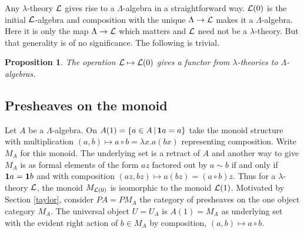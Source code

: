 \documentclass[12pt, amstex, amssymb]{article}
\newtheorem{proposition}[theorem]{Proposition}
\newcommand{\mcat}{\cal}
\newcommand{\app}{{\bf 1}}
\begin{document}
Any $\lambda$-theory $\mcat L$ gives rise to a $\Lambda$-algebra
in a straightforward way. ${\mcat L}(0)$ is the initial $\mcat L$-algebra
and composition with the unique $\Lambda \to {\mcat L}$ makes it a
$\Lambda$-algebra. Here it is only the map $\Lambda \to {\mcat L}$
which matters and ${\mcat L}$ need not be a $\lambda$-theory. But that
generality is of no significance. The following is trivial.
\begin{proposition} 
The operation ${\mcat L} \mapsto {\mcat L}(0)$ gives a functor
from $\lambda$-theories to $\Lambda$-algebras.
\end{proposition}

\subsection{Presheaves on the monoid}\label{monoid}

Let $A$ be a $\Lambda$-algebra. On 
${A}(1) = \{ a\in A \, | \, \app a = a \}$ take the monoid structure
with multiplication
$(a,b) \mapsto a \circ b = \lambda x. a(bx)$
representing composition. Write $M_A$ for this monoid.
The underlying set is a 
retract of $A$ and another way to give $M_A$
is as formal elements of the form $az$ factored out by
$a \sim b$ if and only if $\app a = \app b$ and with
composition $(az, bz) \mapsto a(bz) = (a \circ b)z$.
Thus for a $\lambda$-theory $\cal L$, the monoid 
$M_{{\mcat L}(0)}$ is isomorphic to the monoid ${\mcat L}(1)$. 
Motivated by Section \ref{taylor},
consider $PA = PM_A$ the category of presheaves
on the one object category $M_A$.
The universal object $U = U_A$ is $A(1)=M_A$ as underlying set 
with the evident right action of $b \in M_A$ by composition, 
$(a,b) \mapsto a \circ b$. 
\end{document}
